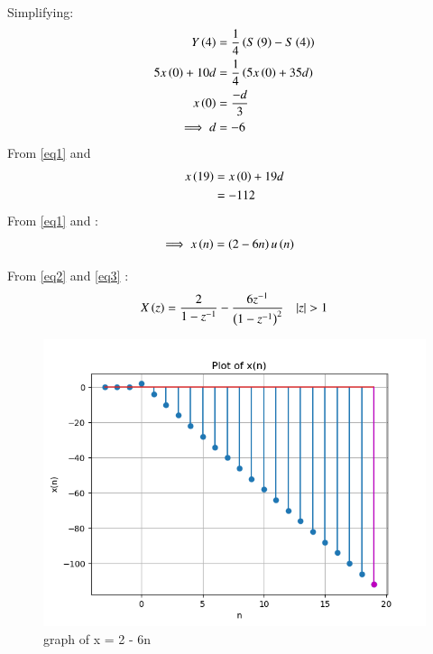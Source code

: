 \documentclass[journal,12pt,twocolumn]{IEEEtran}
\theoremstyle{remark}
\begin{document}
Simplifying:
    \begin{align}
        Y\left(4\right) &= \frac{1}{4}\left(S\left(9\right)-S\left(4\right)\right)\\
        5x\left(0\right) + 10d &= \frac{1}{4}\left(5x\left(0\right) + 35d\right)\\
        x\left(0\right) &= \frac{-d}{3}\\
        \implies d &= -6 \label{eq1}
    \end{align}
    From \eqref{eq1} and 
    \begin{align}
        x\left(19\right)&=x\left(0\right)+19d\\ 
        &= -112
    \end{align}
From \eqref{eq1} and :
    \begin{align}
        \implies x\left(n\right)&=\left(2-6n\right)u\left(n\right) \label{eq3}
    \end{align}
    
From \eqref{eq2} and \eqref{eq3} :
    \begin{align}
        X\brak{z}=\frac{2}{1-z^{-1}} - \frac{6z^{-1}}{\brak{1-z^{-1}}^{2}} \quad |z|>1
    \end{align}

    \begin{figure}[h]
    \renewcommand\thefigure{1}
        \centering
        \includegraphics[width=1\linewidth]{figs/Figure_1.png}
        \caption{graph of x = 2 - 6n}
    \end{figure}
\end{document}
